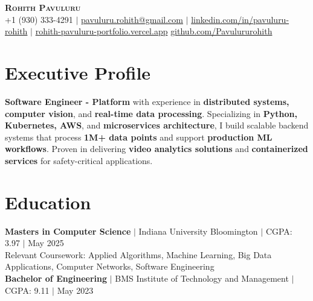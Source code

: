 \documentclass[letterpaper,10pt]{article}
\begin{document}
\begin{center}
    \textbf{\huge \scshape Rohith Pavuluru} \\ \vspace{1pt}
    \small{+1 (930) 333-4291} $|$ \href{mailto:pavuluru.rohith@gmail.com}{pavuluru.rohith@gmail.com} $|$
    \href{https://linkedin.com/in/pavuluru-rohith}{linkedin.com/in/pavuluru-rohith} $|$ \href{https://rohith-pavuluru-portfolio.vercel.app}{rohith-pavuluru-portfolio.vercel.app} 
    \href{https://github.com/Pavulururohith}{github.com/Pavulururohith}
\end{center}
\vspace{-22.5pt}

\section{Executive Profile}
    \small{\textbf{Software Engineer - Platform} with experience in \textbf{distributed systems, computer vision}, and \textbf{real-time data processing}. Specializing in \textbf{Python, Kubernetes, AWS}, and \textbf{microservices architecture}, I build scalable backend systems that process \textbf{1M+ data points} and support \textbf{production ML workflows}. Proven in delivering \textbf{video analytics solutions} and \textbf{containerized services} for safety-critical applications.}
\vspace{-0.4cm}

\section{Education}
\small{\textbf{Masters in Computer Science} $|$ Indiana University Bloomington $|$ CGPA: 3.97 $|$ May 2025}\\
\small{Relevant Coursework: Applied Algorithms, Machine Learning, Big Data Applications, Computer Networks, Software Engineering}\\
\small{\textbf{Bachelor of Engineering} $|$ BMS Institute of Technology and Management $|$ CGPA: 9.11 $|$ May 2023}
\vspace{-12pt}


\end{document}
